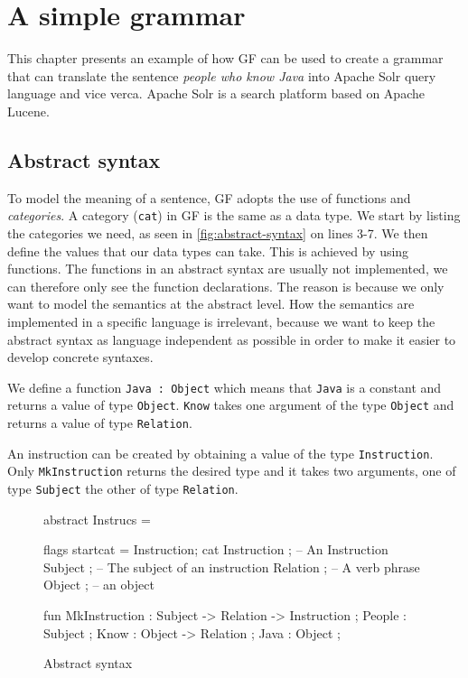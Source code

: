\chapter{A simple grammar}\label{ch:simple-grammar}
This chapter presents an example of how GF can be used to create a grammar that can translate the sentence \emph{people who know Java} into Apache Solr query language and vice verca. Apache Solr is a search platform based on Apache Lucene. \cite{kuc2011apache}

\section{Abstract syntax}
To model the meaning of a sentence, GF adopts the use of functions and \emph{categories}. A category (\texttt{cat}) in GF is the same as a data type. We start by listing the categories we need, as seen in \autoref{fig:abstract-syntax} on lines 3-7. We then define the values that our data types can take. This is achieved by using functions. The functions in an abstract syntax are usually not implemented, we can therefore only see the function declarations. The reason is because we only want to model the semantics at the abstract level. How the semantics are implemented in a specific language is irrelevant, because we want to keep the abstract syntax as language independent as possible in order to make it easier to develop concrete syntaxes.

We define a function \texttt{Java : Object} which means that \texttt{Java} is a constant  and returns a value of type \texttt{Object}. \texttt{Know} takes one argument of the type \texttt{Object} and returns a value of type \texttt{Relation}.

An instruction can be created by obtaining a value of the type \texttt{Instruction}. Only \texttt{MkInstruction} returns the desired type and it takes two arguments, one of type \texttt{Subject} the other of type \texttt{Relation}.

\begin{figure}[H]
\begin{code}
abstract Instrucs = { 
  flags startcat = Instruction; 
  cat
    Instruction ; -- An Instruction
    Subject ;     -- The subject of an instruction
    Relation ;    -- A verb phrase
    Object ;      -- an object

  fun		 	  
    MkInstruction : Subject -> Relation -> Instruction ;
    People : Subject ;
    Know : Object -> Relation ;
    Java : Object ; 
}
\end{code}
\caption{Abstract syntax\label{fig:abstract-syntax}}
\end{figure}

